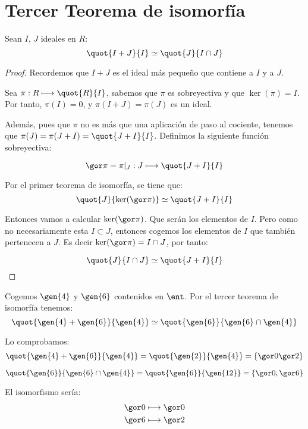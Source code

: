 \section{Tercer Teorema de isomorfía}
\begin{theorem} \label{thm:IsomorfiaAnillos3}
	Sean $I$, $J$ ideales en $R$:
	$$ \quot{I+J}{I} \simeq \quot{J}{I \cap J} $$
\end{theorem}
\begin{proof}
	Recordemos que $I+J$ es el ideal más pequeño que contiene a $I$ y a $J$.


	Sea $\pi: R \longmapsto \quot{R}{I}$, sabemos que $\pi$ es sobreyectiva y que $\ker(\pi)=I$. Por tanto, $\pi(I)=0$, y $\pi(I+J)=\pi(J)$ es un ideal.

	Además, pues que $\pi$ no es más que una aplicación de paso al cociente, tenemos que $\pi(J)=\pi(J+I)=\quot{J+I}{I}$. Definimos la siguiente función sobreyectiva:

	$$ \cls{\pi}=\pi|_J: J \longmapsto \quot{J+I}{I}  $$

	Por el primer teorema de isomorfía, se tiene que:
	$$ \quot{J}{\ker(\cls{\pi})} \simeq \quot{J+I}{I} $$

	Entonces vamos a calcular $\ker(\cls{\pi})$. Que serán los elementos de $I$. Pero como no necesariamente esta $I\subset J$, entonces cogemos los elementos de $I$ que también pertenecen a $J$. Es decir $\ker(\cls{\pi})=I \cap J$, por tanto:

	$$ \quot{J}{I \cap J} \simeq \quot{J+I}{I} $$

\end{proof}


\begin{example}
	Cogemos $\gen{4}$ y $\gen{6}$ contenidos en $\ent$. Por el tercer teorema de isomorfía tenemos:
	$$ \quot{\gen{4}+\gen{6}}{\gen{4}}\simeq \quot{\gen{6}}{\gen{6} \cap \gen{4}} $$

	Lo comprobamos:
	$$\quot{\gen{4}+\gen{6}}{\gen{4}} = \quot{\gen{2}}{\gen{4}}=\{ \cls{0} \cls{2} \}$$

	$$ \quot{\gen{6}}{\gen{6} \cap \gen{4}} = \quot{\gen{6}}{\gen{12}} = \{ \cls{0}, \cls{6} \}$$

	El isomorfismo sería:
	\begin{align*}
		\cls{0}  & \longmapsto  \cls{0}\\
		\cls{6} & \longmapsto \cls{2} \\
	\end{align*}
\end{example}

